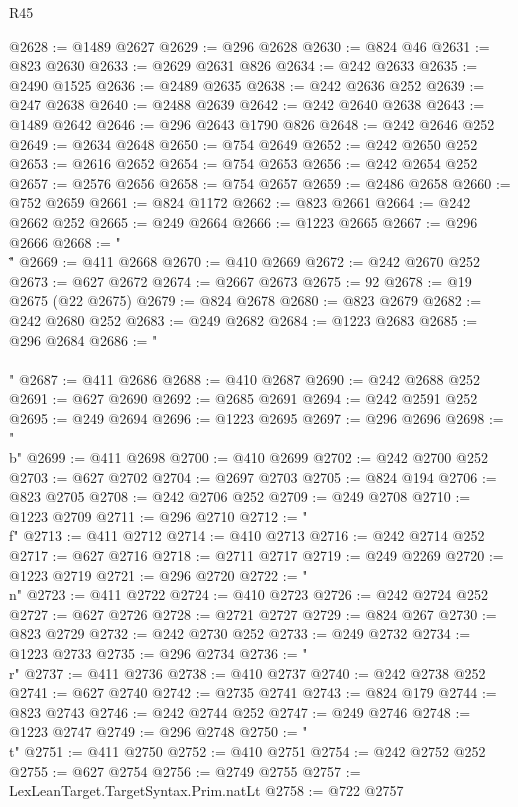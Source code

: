 \begin{lexlean}{R45}
\begin{coremodule}
{@2628 := @1489 @2627
@2629 := @296 @2628
@2630 := @824 @46
@2631 := @823 @2630
@2633 := @2629 @2631 @826
@2634 := @242 @2633
@2635 := @2490 @1525
@2636 := @2489 @2635
@2638 := @242 @2636 @252
@2639 := @247 @2638
@2640 := @2488 @2639
@2642 := @242 @2640 @2638
@2643 := @1489 @2642
@2646 := @296 @2643 @1790 @826
@2648 := @242 @2646 @252
@2649 := @2634 @2648
@2650 := @754 @2649
@2652 := @242 @2650 @252
@2653 := @2616 @2652
@2654 := @754 @2653
@2656 := @242 @2654 @252
@2657 := @2576 @2656
@2658 := @754 @2657
@2659 := @2486 @2658
@2660 := @752 @2659
@2661 := @824 @1172
@2662 := @823 @2661
@2664 := @242 @2662 @252
@2665 := @249 @2664
@2666 := @1223 @2665
@2667 := @296 @2666
@2668 := "\\\""
@2669 := @411 @2668
@2670 := @410 @2669
@2672 := @242 @2670 @252
@2673 := @627 @2672
@2674 := @2667 @2673
@2675 := 92
@2678 := @19 @2675 (@22 @2675)
@2679 := @824 @2678
@2680 := @823 @2679
@2682 := @242 @2680 @252
@2683 := @249 @2682
@2684 := @1223 @2683
@2685 := @296 @2684
@2686 := "\\\\"
@2687 := @411 @2686
@2688 := @410 @2687
@2690 := @242 @2688 @252
@2691 := @627 @2690
@2692 := @2685 @2691
@2694 := @242 @2591 @252
@2695 := @249 @2694
@2696 := @1223 @2695
@2697 := @296 @2696
@2698 := "\\b"
@2699 := @411 @2698
@2700 := @410 @2699
@2702 := @242 @2700 @252
@2703 := @627 @2702
@2704 := @2697 @2703
@2705 := @824 @194
@2706 := @823 @2705
@2708 := @242 @2706 @252
@2709 := @249 @2708
@2710 := @1223 @2709
@2711 := @296 @2710
@2712 := "\\f"
@2713 := @411 @2712
@2714 := @410 @2713
@2716 := @242 @2714 @252
@2717 := @627 @2716
@2718 := @2711 @2717
@2719 := @249 @2269
@2720 := @1223 @2719
@2721 := @296 @2720
@2722 := "\\n"
@2723 := @411 @2722
@2724 := @410 @2723
@2726 := @242 @2724 @252
@2727 := @627 @2726
@2728 := @2721 @2727
@2729 := @824 @267
@2730 := @823 @2729
@2732 := @242 @2730 @252
@2733 := @249 @2732
@2734 := @1223 @2733
@2735 := @296 @2734
@2736 := "\\r"
@2737 := @411 @2736
@2738 := @410 @2737
@2740 := @242 @2738 @252
@2741 := @627 @2740
@2742 := @2735 @2741
@2743 := @824 @179
@2744 := @823 @2743
@2746 := @242 @2744 @252
@2747 := @249 @2746
@2748 := @1223 @2747
@2749 := @296 @2748
@2750 := "\\t"
@2751 := @411 @2750
@2752 := @410 @2751
@2754 := @242 @2752 @252
@2755 := @627 @2754
@2756 := @2749 @2755
@2757 := LexLeanTarget.TargetSyntax.Prim.natLt
@2758 := @722 @2757
}
\end{coremodule}
\end{lexlean}
